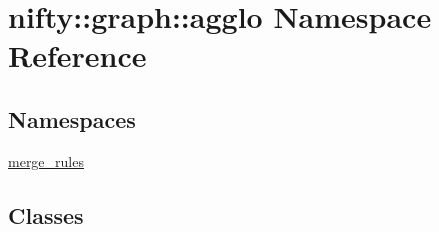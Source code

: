 \hypertarget{namespacenifty_1_1graph_1_1agglo}{}\section{nifty\+:\+:graph\+:\+:agglo Namespace Reference}
\label{namespacenifty_1_1graph_1_1agglo}
\subsection*{Namespaces}
\begin{DoxyCompactItemize}
\item 
 \hyperlink{namespacenifty_1_1graph_1_1agglo_1_1merge__rules}{merge\+\_\+rules}
\end{DoxyCompactItemize}
\subsection*{Classes}
